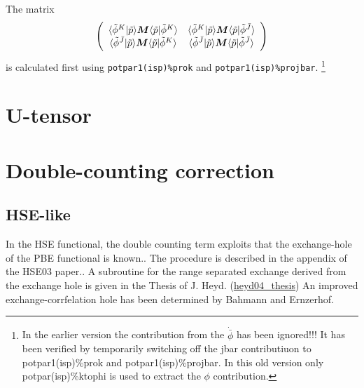 \documentclass[11pt,a4paper]{report}
\begin{document}
The matrix 
\begin{eqnarray}
\left(\begin{array}{cc}
\langle\tilde{\phi}^{K}|\tilde{p}\rangle 
\bm{M}\langle\tilde{p}|\tilde{\phi}^{K}\rangle &
\langle\tilde{\phi}^{K}|\tilde{p}\rangle 
\bm{M}\langle\tilde{p}|\tilde{\phi}^{\bar{J}}\rangle \\
\langle\tilde{\phi}^{\bar{J}}|\tilde{p}\rangle 
\bm{M}\langle\tilde{p}|\tilde{\phi}^{K}\rangle &
\langle\tilde{\phi}^{\bar{J}}|\tilde{p}\rangle 
\bm{M}\langle\tilde{p}|\tilde{\phi}^{\bar{J}}\rangle \\
\end{array}\right)
\end{eqnarray}
is calculated first using \verb|potpar1(isp)%prok| and
\verb|potpar1(isp)%projbar|.
\footnote{ In the earlier version the contribution from the
  $\dot{\bar{\phi}}$ has been ignored!!! It has been verified by
  temporarily switching off the jbar contributiuon to
  potpar1(isp)\%prok and potpar1(isp)\%projbar. In this old version
  only potpar(isp)\%ktophi is used to extract the $\phi$
  contribution.}

\section{U-tensor}
\section{Double-counting correction}


\subsection{HSE-like}
In the HSE functional\cite{heyd03_jcp118_8207}, the double counting
term exploits that the exchange-hole of the PBE functional is
known.\cite{ernzerhof98_jcp109_3313}. The procedure is described in
the appendix of the HSE03 paper.\cite{heyd03_jcp118_8207}. A
subroutine for the range separated exchange derived from the exchange
hole is given in the Thesis of J. Heyd. (\url{heyd04_thesis}) An
improved exchange-corrfelation hole has been determined by Bahmann and
Ernzerhof\cite{bahmann08_jcp128_234104}.
\end{document}
